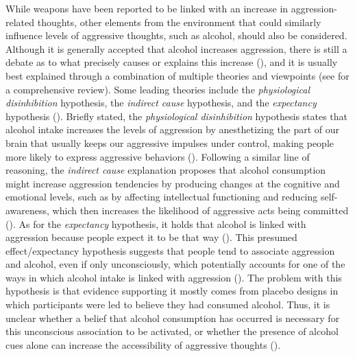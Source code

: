 \documentclass[serif, twocolumn, numeric, empirical]{jote-article}
\begin{document}
While weapons have been reported to be linked with an increase in aggression-related thoughts, other elements from the environment that could similarly influence levels of aggressive thoughts, such as alcohol, should also be considered. Although it is generally accepted that alcohol increases aggression, there is still a debate as to what precisely causes or explains this increase (\cite{BartholowHeinz2006}), and it is usually best explained through a combination of multiple theories and viewpoints (see \textcite{HeinzBeckMeyerLindenbergSterzerHeinz2011} for a comprehensive review). Some leading theories include the \textit{physiological disinhibition} hypothesis, the \textit{indirect cause} hypothesis, and the \textit{expectancy }hypothesis (\cite{Bushman2002}). Briefly stated, the \textit{physiological disinhibition} hypothesis states that alcohol intake increases the levels of aggression by anesthetizing the part of our brain that usually keeps our aggressive impulses under control, making people more likely to express aggressive behaviors (\cite{Bushman2002}). Following a similar line of reasoning, the \textit{indirect cause} explanation proposes that alcohol consumption might increase aggression tendencies by producing changes at the cognitive and emotional levels, such as by affecting intellectual functioning and reducing self-awareness, which then increases the likelihood of aggressive acts being committed (\cite{Bushman2002}). As for the \textit{expectancy }hypothesis, it holds that alcohol is linked with aggression because people expect it to be that way (\cite{Bushman2002}). This presumed effect/expectancy hypothesis suggests that people tend to associate aggression and alcohol, even if only unconsciously, which potentially accounts for one of the ways in which alcohol intake is linked with aggression (\cite{BartholowHeinz2006}). The problem with this hypothesis is that evidence supporting it mostly comes from placebo designs in which participants were led to believe they had consumed alcohol. Thus, it is unclear whether a belief that alcohol consumption has occurred is necessary for this unconscious association to be activated, or whether the presence of alcohol cues alone can increase the accessibility of aggressive thoughts (\cite{BartholowHeinz2006}). 
\end{document}
